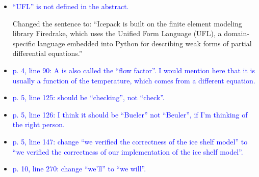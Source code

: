 \documentclass{article}
\theoremstyle{definition}
\theoremstyle{plain}
\begin{document}
\begin{itemize}
\item \textcolor{blue}{``UFL'' is not defined in the abstract.}

Changed the sentence to: ``Icepack is built on the finite element modeling library Firedrake, which uses the Unified Form Language (UFL), a domain-specific language embedded into Python for describing weak forms of partial differential equations.''

\item \textcolor{blue}{p. 4, line 90: A is also called the ``flow factor''. I would mention here that it is usually a function of
the temperature, which comes from a different equation.}
\item \textcolor{blue}{p. 5, line 125: should be ``checking'', not ``check''.} \checkmark
\item \textcolor{blue}{p. 5, line 126: I think it should be ``Bueler'' not ``Beuler'', if I'm thinking of the right person.} \checkmark
\item \textcolor{blue}{p. 5, line 147: change ``we verified the correctness of the ice shelf model'' to ``we verified the correctness
of our implementation of the ice shelf model''.} \checkmark
\item \textcolor{blue}{p. 10, line 270: change ``we'll'' to ``we will''.} \checkmark
\end{itemize}
\end{document}
